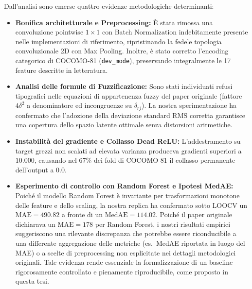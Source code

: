 \documentclass[11pt, a4paper]{article}
\begin{document}
Dall'analisi sono emerse quattro evidenze metodologiche determinanti:
\begin{itemize}
    \item \textbf{Bonifica architetturale e Preprocessing:} È stata rimossa una convoluzione pointwise $1\times1$ con Batch Normalization indebitamente presente nelle implementazioni di riferimento, ripristinando la fedele topologia convoluzionale 2D con Max Pooling. Inoltre, è stato corretto l'encoding categorico di COCOMO-81 (\texttt{dev\_mode}), preservando integralmente le 17 feature descritte in letteratura.
    \item \textbf{Analisi delle formule di Fuzzificazione:} Sono stati individuati refusi tipografici nelle equazioni di appartenenza fuzzy del paper originale (fattore $4\delta^2$ a denominatore ed incongruenze su $\delta_{rj}$). La nostra sperimentazione ha confermato che l'adozione della deviazione standard RMS corretta garantisce una copertura dello spazio latente ottimale senza distorsioni aritmetiche.
    \item \textbf{Instabilità del gradiente e Collasso Dead ReLU:} L'addestramento su target grezzi non scalati ad elevata varianza produceva gradienti superiori a $10.000$, causando nel $67\%$ dei fold di COCOMO-81 il collasso permanente dell'output a $0.0$.
    \item \textbf{Esperimento di controllo con Random Forest e Ipotesi MedAE:} Poiché il modello Random Forest è invariante per trasformazioni monotone delle feature e dello scaling, la nostra replica ha confermato sotto LOOCV un $\text{MAE} = 490.82$ a fronte di un $\text{MedAE} = 114.02$. Poiché il paper originale dichiarava un $\text{MAE} = 178$ per Random Forest, i nostri risultati empirici suggeriscono una rilevante discrepanza che potrebbe essere riconducibile a una differente aggregazione delle metriche (es.\ MedAE riportata in luogo del MAE) o a scelte di preprocessing non esplicitate nei dettagli metodologici originali. Tale evidenza rende essenziale la formalizzazione di un baseline rigorosamente controllato e pienamente riproducibile, come proposto in questa tesi.
\end{itemize}
\end{document}
